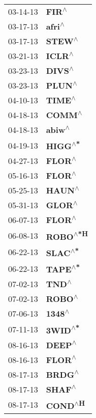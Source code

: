 \begin{supertabular}{p{0.08\textwidth}p{0.2\textwidth}}
 03-14-13 &     \textbf{FIR\textsuperscript{$\wedge$}} \\
 03-17-13 &    \textbf{afri\textsuperscript{$\wedge$}} \\
 03-17-13 &    \textbf{STEW\textsuperscript{$\wedge$}} \\
 03-21-13 &    \textbf{ICLR\textsuperscript{$\wedge$}} \\
 03-23-13 &    \textbf{DIVS\textsuperscript{$\wedge$}} \\
 03-23-13 &    \textbf{PLUN\textsuperscript{$\wedge$}} \\
 04-10-13 &    \textbf{TIME\textsuperscript{$\wedge$}} \\
 04-18-13 &    \textbf{COMM\textsuperscript{$\wedge$}} \\
 04-18-13 &    \textbf{abiw\textsuperscript{$\wedge$}} \\
 04-19-13 &   \textbf{HIGG\textsuperscript{$\wedge$*}} \\
 04-27-13 &    \textbf{FLOR\textsuperscript{$\wedge$}} \\
 05-16-13 &    \textbf{FLOR\textsuperscript{$\wedge$}} \\
 05-25-13 &    \textbf{HAUN\textsuperscript{$\wedge$}} \\
 05-31-13 &    \textbf{GLOR\textsuperscript{$\wedge$}} \\
 06-07-13 &    \textbf{FLOR\textsuperscript{$\wedge$}} \\
 06-08-13 &  \textbf{ROBO\textsuperscript{$\wedge$*H}} \\
 06-22-13 &   \textbf{SLAC\textsuperscript{$\wedge$*}} \\
 06-22-13 &   \textbf{TAPE\textsuperscript{$\wedge$*}} \\
 07-02-13 &     \textbf{TND\textsuperscript{$\wedge$}} \\
 07-02-13 &    \textbf{ROBO\textsuperscript{$\wedge$}} \\
 07-06-13 &    \textbf{1348\textsuperscript{$\wedge$}} \\
 07-11-13 &   \textbf{3WID\textsuperscript{$\wedge$*}} \\
 08-16-13 &    \textbf{DEEP\textsuperscript{$\wedge$}} \\
 08-16-13 &    \textbf{FLOR\textsuperscript{$\wedge$}} \\
 08-17-13 &    \textbf{BRDG\textsuperscript{$\wedge$}} \\
 08-17-13 &    \textbf{SHAF\textsuperscript{$\wedge$}} \\
 08-17-13 &   \textbf{COND\textsuperscript{$\wedge$H}} \\

\end{supertabular}
